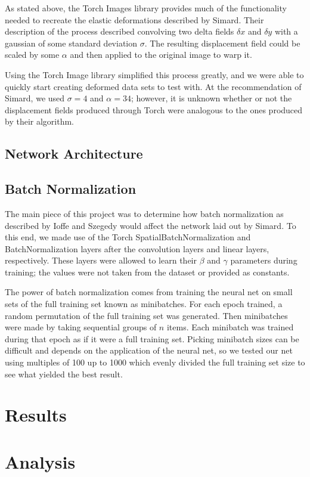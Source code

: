 \documentclass{article}
\begin{document}
As stated above, the Torch Images library provides much of the functionality needed to recreate the elastic deformations described by Simard. Their description of the process described convolving two delta fields $\delta x$ and $\delta y$ with a gaussian of some standard deviation $\sigma$. The resulting displacement field could be scaled by some $\alpha$ and then applied to the original image to warp it.

Using the Torch Image library simplified this process greatly, and we were able to quickly start creating deformed data sets to test with. At the recommendation of Simard, we used $\sigma=4$ and $\alpha=34$; however, it is unknown whether or not the displacement fields produced through Torch were analogous to the ones produced by their algorithm.

\subsection{Network Architecture}

\subsection{Batch Normalization}
The main piece of this project was to determine how batch normalization as described by Ioffe and Szegedy would affect the network laid out by Simard. To this end, we made use of the Torch SpatialBatchNormalization and BatchNormalization layers after the convolution layers and linear layers, respectively. These layers were allowed to learn their $\beta$ and $\gamma$ parameters during training; the values were not taken from the dataset or provided as constants.

The power of batch normalization comes from training the neural net on small sets of the full training set known as minibatches. For each epoch trained, a random permutation of the full training set was generated. Then minibatches were made by taking sequential groups of $n$ items. Each minibatch was trained during that epoch as if it were a full training set. Picking minibatch sizes can be difficult and depends on the application of the neural net, so we tested our net using multiples of 100 up to 1000 which evenly divided the full training set size to see what yielded the best result.
\section{Results}

\section{Analysis}
\end{document}
